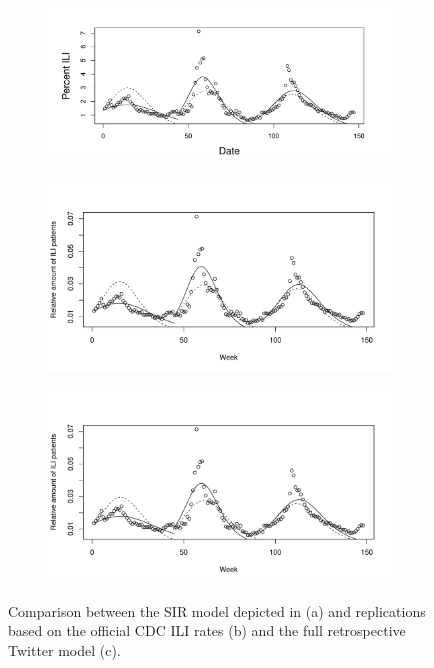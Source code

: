 \documentclass[11pt, a4paper]{report}\usepackage[]{graphicx}\usepackage[]{color}
\begin{document}
\begin{figure}[H]
\centering
  \begin{subfigure}[t]{0.65\textwidth}
  \includegraphics[width=1\linewidth,height=0.5\linewidth]{todd_bodnar_SIR.png}
  \caption{}
  \label{fig:SIR_comparison_original}
  \end{subfigure}
  
  \begin{subfigure}[t]{0.6\textwidth}
  \includegraphics[width=1\linewidth,height=0.5\linewidth]{SIR_model_cdc_data_25.pdf}
  \caption{}
  \label{fig:SIR_comparison_CDC}
  \end{subfigure}
  
  \begin{subfigure}[t]{0.6\textwidth}
  \includegraphics[width=1\linewidth,height=0.5\linewidth]{SIR_model_full_model_25.pdf}
  \caption{}
  \label{fig:SIR_comparison_full}
  \end{subfigure}
  \caption{Comparison between the SIR model depicted in \citep{bodnar_data_2015} (a) and replications based on the official CDC ILI rates (b) and the full retrospective Twitter model (c).}
\end{figure}
\end{document}
